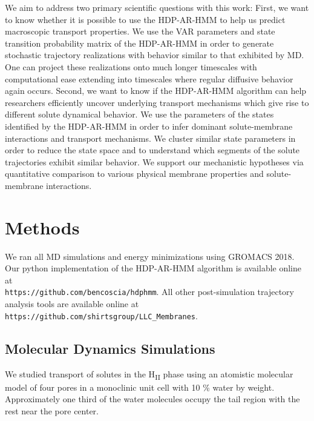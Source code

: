 \documentclass[journal=jpcbfk,manuscript=article]{achemso}
\begin{document}
  We aim to address two primary scientific questions with this work:
  First, we want to know whether it is possible to use the HDP-AR-HMM to 
  help us predict macroscopic transport properties. We use the VAR parameters
  and state transition probability matrix of the HDP-AR-HMM in order to 
  generate stochastic trajectory realizations with behavior similar to that
  exhibited by MD. One can project these realizations onto much longer 
  timescales with computational ease extending into timescales where 
  regular diffusive behavior again occurs.
  Second, we want to know if the HDP-AR-HMM algorithm can help researchers
  efficiently uncover underlying transport mechanisms which give rise to different 
  solute dynamical behavior.
  We use the parameters of the states identified by the HDP-AR-HMM in order to infer 
  dominant solute-membrane interactions and transport mechanisms. We cluster similar 
  state parameters in order to reduce the state space and to understand which segments 
  of the solute trajectories exhibit similar behavior. We support our mechanistic 
  hypotheses via quantitative comparison to various physical membrane properties and
  solute-membrane interactions.
  
  \section{Methods}
    
  We ran all MD simulations and energy minimizations using GROMACS 2018.
  ~\cite{bekker_gromacs:_1993,berendsen_gromacs:_1995,van_der_spoel_gromacs:_2005,hess_gromacs_2008}  
  Our python implementation of the HDP-AR-HMM algorithm is available online at \\
  \texttt{https://github.com/bencoscia/hdphmm}. All other post-simulation 
  trajectory analysis tools are available online at
  \texttt{https://github.com/shirtsgroup/LLC\_Membranes}.

  \subsection{Molecular Dynamics Simulations}

  We studied transport of solutes in the H\textsubscript{II} phase using an
  atomistic molecular model of four pores in a monoclinic unit cell with 
  10 \% water by weight. Approximately one third of the water molecules 
  occupy the tail region with the rest near the pore center.
  
\end{document}
